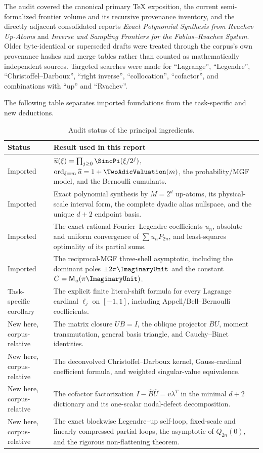 \documentclass[11pt]{article}
\theoremstyle{definition}
\theoremstyle{remark}
\newcommand{\MM}{\mathsf M}
\DeclareMathOperator{\ord}{ord}
\begin{document}
The audit covered the canonical primary TeX exposition, the current
semi-formalized frontier volume and its recursive provenance inventory, and the
directly adjacent consolidated reports
\emph{Exact Polynomial Synthesis from Rvachev Up-Atoms} and
\emph{Inverse and Sampling Frontiers for the Fabius--Rvachev System}.  Older
byte-identical or superseded drafts were treated through the corpus's own
provenance hashes and merge tables rather than counted as mathematically
independent sources.  Targeted searches were made for
``Lagrange'', ``Legendre'', ``Christoffel--Darboux'', ``right inverse'',
``collocation'', ``cofactor'', and combinations with ``up'' and ``Rvachev''.

The following table separates imported foundations from the task-specific and
new deductions.

\begin{table}[H]
\centering
\small
\begin{tabularx}{\textwidth}{@{}p{}X@{}}
\toprule
Status & Result used in this report \\
\midrule
Imported &
$\widehat u(\xi)=\prod_{j\ge0}\SincPi(\xi/2^j)$,
$\ord_{\xi=m}\widehat u=1+\TwoAdicValuation(m)$, the probability/MGF model,
and the Bernoulli cumulants. \\
Imported &
Exact polynomial synthesis by $M=2^d$ up-atoms, its physical-scale interval
form, the complete dyadic alias nullspace, and the unique $d+2$ endpoint basis.\\
Imported &
The exact rational Fourier--Legendre coefficients $u_n$, absolute and uniform
convergence of $\sum u_nP_{2n}$, and least-squares optimality of its partial
sums.\\
Imported &
The reciprocal-MGF three-shell asymptotic, including the dominant poles
$\pm2\pi\ImaginaryUnit$ and the constant $C=\MM_u(\pi\ImaginaryUnit)$.\\
Task-specific corollary &
The explicit finite literal-shift formula for every Lagrange cardinal
$\ell_j$ on $[-1,1]$, including Appell/Bell--Bernoulli coefficients.\\
New here, corpus-relative &
The matrix closure $UB=I$, the oblique projector $BU$, moment transmutation,
general basis triangle, and Cauchy--Binet identities.\\
New here, corpus-relative &
The deconvolved Christoffel--Darboux kernel, Gauss-cardinal coefficient formula,
and weighted singular-value equivalence.\\
New here, corpus-relative &
The cofactor factorization $I-\widehat B\widehat U=v\lambda^T$ in the minimal
$d+2$ dictionary and its one-scalar nodal-defect decomposition.\\
New here, corpus-relative &
The exact blockwise Legendre--up self-loop, fixed-scale and linearly compressed
partial loops, the asymptotic of $Q_{2n}(0)$, and the rigorous non-flattening
theorem.\\
\bottomrule
\end{tabularx}
\caption{Audit status of the principal ingredients.}
\label{tab:audit}
\end{table}
\end{document}
